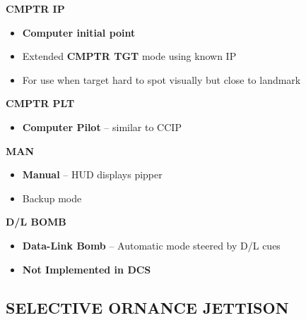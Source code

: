 \documentclass[fontSpartan]{TechCheck}
\begin{document}
\begin{longtableitemize}
{\begin{subitemize}
\begin{itemize}
			\end{itemize}
			\item \textbf{CMPTR IP}
			\begin{itemize}
				\item \textbf{Computer initial point}
				\item Extended \textbf{CMPTR TGT} mode using known IP
				\item For use when target hard to spot visually but close to landmark
			\end{itemize}
			\item \textbf{CMPTR PLT}
			\begin{itemize}
				\item \textbf{Computer Pilot} -- similar to CCIP
			\end{itemize}
			\item \textbf{MAN}
			\begin{itemize}
				\item \textbf{Manual} -- HUD displays pipper
				\item Backup mode
			\end{itemize}
			\item \textbf{D/L BOMB}
			\begin{itemize}
				\item \textbf{Data-Link Bomb} -- Automatic mode steered by D/L cues
				\item \textbf{Not Implemented in DCS}
			\end{itemize}
		\end{subitemize}}
	\end{longtableitemize}


	\subsection{SELECTIVE ORNANCE JETTISON}
	\begin{tablenumerate}
	\end{tablenumerate}
\end{document}
